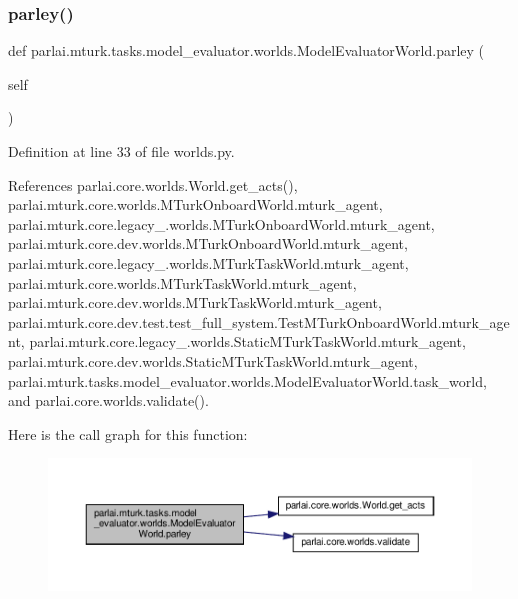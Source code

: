 \subsubsection{\texorpdfstring{parley()}{parley()}}
{\footnotesize\ttfamily def parlai.\+mturk.\+tasks.\+model\+\_\+evaluator.\+worlds.\+Model\+Evaluator\+World.\+parley (\begin{DoxyParamCaption}\item[{}]{self }\end{DoxyParamCaption})}



Definition at line 33 of file worlds.\+py.



References parlai.\+core.\+worlds.\+World.\+get\+\_\+acts(), parlai.\+mturk.\+core.\+worlds.\+M\+Turk\+Onboard\+World.\+mturk\+\_\+agent, parlai.\+mturk.\+core.\+legacy\+\_.\+worlds.\+M\+Turk\+Onboard\+World.\+mturk\+\_\+agent, parlai.\+mturk.\+core.\+dev.\+worlds.\+M\+Turk\+Onboard\+World.\+mturk\+\_\+agent, parlai.\+mturk.\+core.\+legacy\+\_.\+worlds.\+M\+Turk\+Task\+World.\+mturk\+\_\+agent, parlai.\+mturk.\+core.\+worlds.\+M\+Turk\+Task\+World.\+mturk\+\_\+agent, parlai.\+mturk.\+core.\+dev.\+worlds.\+M\+Turk\+Task\+World.\+mturk\+\_\+agent, parlai.\+mturk.\+core.\+dev.\+test.\+test\+\_\+full\+\_\+system.\+Test\+M\+Turk\+Onboard\+World.\+mturk\+\_\+agent, parlai.\+mturk.\+core.\+legacy\+\_.\+worlds.\+Static\+M\+Turk\+Task\+World.\+mturk\+\_\+agent, parlai.\+mturk.\+core.\+dev.\+worlds.\+Static\+M\+Turk\+Task\+World.\+mturk\+\_\+agent, parlai.\+mturk.\+tasks.\+model\+\_\+evaluator.\+worlds.\+Model\+Evaluator\+World.\+task\+\_\+world, and parlai.\+core.\+worlds.\+validate().

Here is the call graph for this function\+:
\nopagebreak
\begin{figure}[H]
\begin{center}
\leavevmode
\includegraphics[width=350pt]{classparlai_1_1mturk_1_1tasks_1_1model__evaluator_1_1worlds_1_1ModelEvaluatorWorld_a7d840b488712356ef04fd9c767f55797_cgraph}
\end{center}
\end{figure}
\mbox{\label{classparlai_1_1mturk_1_1tasks_1_1model__evaluator_1_1worlds_1_1ModelEvaluatorWorld_a4795df492ce6d443379cd5f28671d3bf}} 
